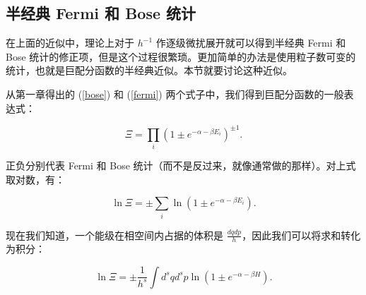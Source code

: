 \subsection{半经典 Fermi 和 Bose 统计}
在上面的近似中，理论上对于 $h^{-1}$ 作逐级微扰展开就可以得到半经典 Fermi 和 Bose 统计的修正项，但是这个过程很繁琐。更加简单的办法是使用粒子数可变的统计，也就是巨配分函数的半经典近似。本节就要讨论这种近似。

从第一章得出的 (\ref{bose}) 和 (\ref{fermi}) 两个式子中，我们得到巨配分函数的一般表达式：
\begin{linenomath}\begin{equation}
    \Xi = \prod_i \left( 1 \pm e^{-\alpha -\beta E_i } \right)^{\pm 1}.
\end{equation}\end{linenomath}
正负分别代表 Fermi 和 Bose 统计（而不是反过来，就像通常做的那样）。对上式取对数，有：
\begin{linenomath}\begin{equation}
    \ln \Xi = \pm \sum_i \ln\left( 1 \pm e^{-\alpha -\beta E_i } \right).
\end{equation}\end{linenomath}
现在我们知道，一个能级在相空间内占据的体积是 $\frac{dqdp}{h}$，因此我们可以将求和转化为积分：
\begin{linenomath}\begin{equation}
    \ln \Xi = \pm \frac{1}{h^s} \int d^s q d^s p \ln\left( 1 \pm e^{-\alpha -\beta H} \right).
\end{equation}\end{linenomath}


